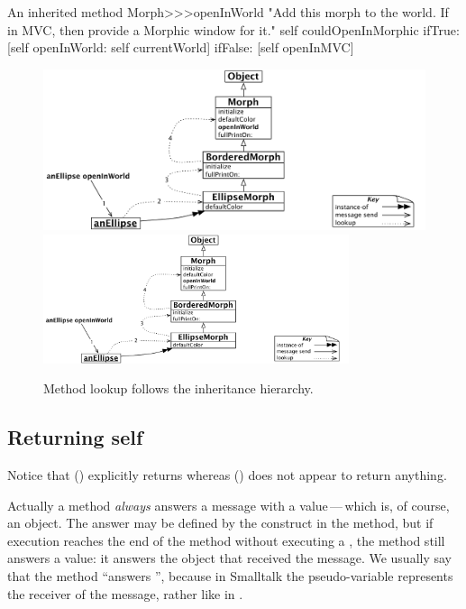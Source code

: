 \documentclass[a4paper,10pt,twoside]{book}
\begin{document}
\begin{method}[openInWorld]{An inherited method}
Morph>>>openInWorld
	"Add this morph to the world.  If in MVC, then provide a Morphic window for it."
	self couldOpenInMorphic
		ifTrue: [self openInWorld: self currentWorld]
		ifFalse: [self openInMVC]
\end{method}

\begin{figure}[htb]
\begin{center}
\ifluluelse
	{\includegraphics[width=\textwidth]{openInWorldLookup}}
	{\includegraphics[width=0.8\textwidth]{openInWorldLookup}}
\caption{Method lookup follows the inheritance hierarchy.\label{fig:openInWorldLookup}}
\end{center}
\end{figure}

\subsection{Returning self}

Notice that  () explicitly returns  whereas  () does not appear to return anything.

Actually a method \emph{always} answers a message with a value\,---\,which is, of course, an object.
The answer may be defined by the \ct{^} construct in the method, but if execution reaches the end of the method without executing a \ct{^}, the method still answers a value: it answers the object that received the message.
We usually say that the method ``answers \self'', because in Smalltalk the pseudo-variable \self represents the receiver of the message, rather like  in .
\end{document}
